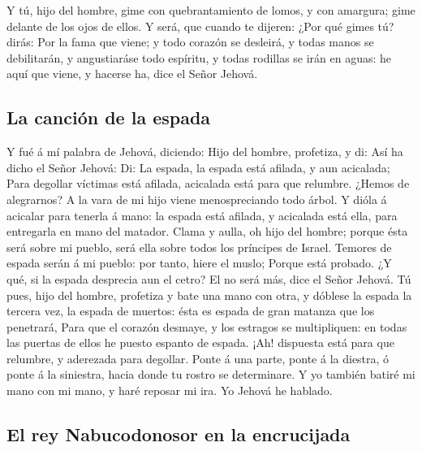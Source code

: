  Y tú, hijo del hombre, gime con quebrantamiento de lomos,
y con amargura; gime delante de los ojos de ellos.  Y
será, que cuando te dijeren: ¿Por qué gimes tú? dirás: Por la fama que
viene; y todo corazón se desleirá, y todas manos se debilitarán, y
angustiaráse todo espíritu, y todas rodillas se irán en aguas: he aquí
que viene, y hacerse ha, dice el Señor Jehová.

\hypertarget{la-canciuxf3n-de-la-espada}{%
\subsection{La canción de la espada}\label{la-canciuxf3n-de-la-espada}}

 Y fué á mí palabra de Jehová, diciendo: 
Hijo del hombre, profetiza, y di: Así ha dicho el Señor Jehová: Di: La
espada, la espada está afilada, y aun acicalada;  Para
degollar víctimas está afilada, acicalada está para que relumbre. ¿Hemos
de alegrarnos? A la vara de mi hijo viene menospreciando todo árbol.
 Y dióla á acicalar para tenerla á mano: la espada está
afilada, y acicalada está ella, para entregarla en mano del matador.
 Clama y aulla, oh hijo del hombre; porque ésta será
sobre mi pueblo, será ella sobre todos los príncipes de Israel. Temores
de espada serán á mi pueblo: por tanto, hiere el muslo; 
Porque está probado. ¿Y qué, si la espada desprecia aun el cetro? El no
será más, dice el Señor Jehová.  Tú pues, hijo del
hombre, profetiza y bate una mano con otra, y dóblese la espada la
tercera vez, la espada de muertos: ésta es espada de gran matanza que
los penetrará,  Para que el corazón desmaye, y los
estragos se multipliquen: en todas las puertas de ellos he puesto
espanto de espada. ¡Ah! dispuesta está para que relumbre, y aderezada
para degollar.  Ponte á una parte, ponte á la diestra, ó
ponte á la siniestra, hacia donde tu rostro se determinare.
 Y yo también batiré mi mano con mi mano, y haré reposar
mi ira. Yo Jehová he hablado.

\hypertarget{el-rey-nabucodonosor-en-la-encrucijada}{%
\subsection{El rey Nabucodonosor en la
encrucijada}\label{el-rey-nabucodonosor-en-la-encrucijada}}

